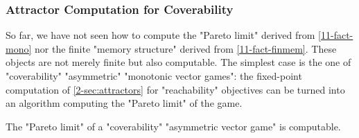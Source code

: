 \subsubsection{Attractor Computation for Coverability}
\label{11-subsec:attr}
So far, we have not seen how to compute the "Pareto limit" derived
from \cref{11-fact-mono} nor the finite "memory structure" derived
from \cref{11-fact-finmem}.  These objects are not merely finite but
also computable.  The simplest case is the one of "coverability"
"asymmetric" "monotonic vector games": the fixed-point computation of
\cref{2-sec:attractors} for "reachability" objectives can be turned into
an algorithm computing the "Pareto limit" of the game.

\begin{fact}\label{11-pareto-cov}
  The "Pareto limit" of a "coverability" "asymmetric vector game" is
  computable.
\end{fact}
